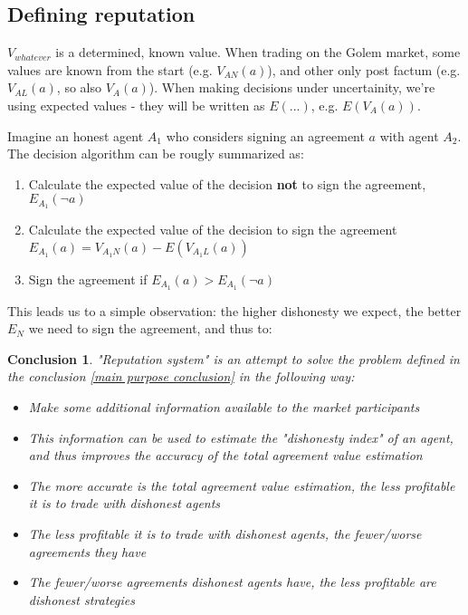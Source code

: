 \documentclass{article}
\newtheorem{conclusion}{Conclusion}[section]
\begin{document}
\subsection{Defining reputation}

$V_{whatever}$ is a determined, known value. When trading on the Golem market, some values are known from the start (e.g. $V_{AN}(a)$), 
and other only post factum (e.g. $V_{AL}(a)$, so also $V_A(a)$).
When making decisions under uncertainity, we're using expected values - they will be written as $E(...)$, e.g. $E(V_A(a))$.

Imagine an honest agent $A_1$ who considers signing an agreement $a$ with agent $A_2$. The decision algorithm can be rougly summarized as:
\begin{enumerate}
\item Calculate the expected value of the decision \textbf{not} to sign the agreement, $E_{A_1}(\neg a)$
\item Calculate the expected value of the decision to sign the agreement $E_{A_1}(a) = V_{A_1N}(a) - E(V_{A_1L}(a))$
\item Sign the agreement if $E_{A_1}(a) > E_{A_1}(\neg a)$
\end{enumerate}

This leads us to a simple observation: the higher dishonesty we expect, the better $E_N$ we need to sign the agreement, and thus to:

\begin{conclusion}

"Reputation system" is an attempt to solve the problem defined in the conclusion \ref{main purpose conclusion} in the following way:

\begin{itemize}
    \item Make some additional information available to the market participants
    \item This information can be used to estimate the "dishonesty index" of an agent, and thus improves the accuracy of the total agreement value estimation
    \item The more accurate is the total agreement value estimation, the less profitable it is to trade with dishonest agents
    \item The less profitable it is to trade with dishonest agents, the fewer/worse agreements they have
    \item The fewer/worse agreements dishonest agents have, the less profitable are dishonest strategies
\end{itemize}

\end{conclusion}
\end{document}
